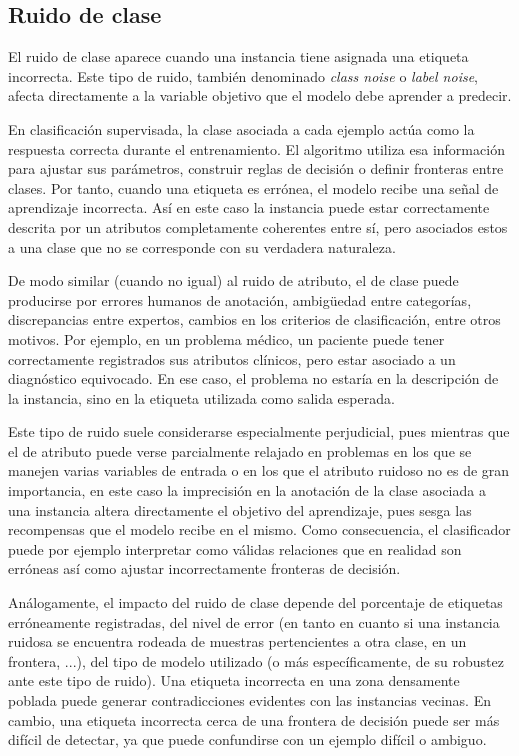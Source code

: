 \documentclass[print, color]{ugrTFG}
\begin{document}
\subsection{Ruido de clase}

El ruido de clase aparece cuando una instancia tiene asignada una etiqueta incorrecta. Este tipo de ruido, también denominado \textit{class noise} o \textit{label noise}, afecta directamente a la variable objetivo que el modelo debe aprender a predecir.

En clasificación supervisada, la clase asociada a cada ejemplo actúa como la respuesta correcta durante el entrenamiento. El algoritmo utiliza esa información para ajustar sus parámetros, construir reglas de decisión o definir fronteras entre clases. Por tanto, cuando una etiqueta es errónea, el modelo recibe una señal de aprendizaje incorrecta. Así en este caso la instancia puede estar correctamente descrita por un atributos completamente coherentes entre sí, pero asociados estos a una clase que no se corresponde con su verdadera naturaleza.

De modo similar (cuando no igual) al ruido de atributo, el de clase puede producirse por errores humanos de anotación, ambigüedad entre categorías, discrepancias entre expertos, cambios en los criterios de clasificación, entre otros motivos. Por ejemplo, en un problema médico, un paciente puede tener correctamente registrados sus atributos clínicos, pero estar asociado a un diagnóstico equivocado. En ese caso, el problema no estaría en la descripción de la instancia, sino en la etiqueta utilizada como salida esperada.

Este tipo de ruido suele considerarse especialmente perjudicial, pues mientras que el de atributo puede verse parcialmente relajado en problemas en los que se manejen varias variables de entrada o en los que el atributo ruidoso no es de gran importancia, en este caso la imprecisión en la anotación de la clase asociada a una instancia altera directamente el objetivo del aprendizaje, pues sesga las recompensas que el modelo recibe en el mismo. Como consecuencia, el clasificador puede por ejemplo interpretar como válidas relaciones que en realidad son erróneas así como ajustar incorrectamente fronteras de decisión.

Análogamente, el impacto del ruido de clase depende del porcentaje de etiquetas erróneamente registradas, del nivel de error (en tanto en cuanto si una instancia ruidosa se encuentra rodeada de muestras pertencientes a otra clase, en un frontera, ...), del tipo de modelo utilizado (o más específicamente, de su robustez ante este tipo de ruido). Una etiqueta incorrecta en una zona densamente poblada puede generar contradicciones evidentes con las instancias vecinas. En cambio, una etiqueta incorrecta cerca de una frontera de decisión puede ser más difícil de detectar, ya que puede confundirse con un ejemplo difícil o ambiguo.
\end{document}
